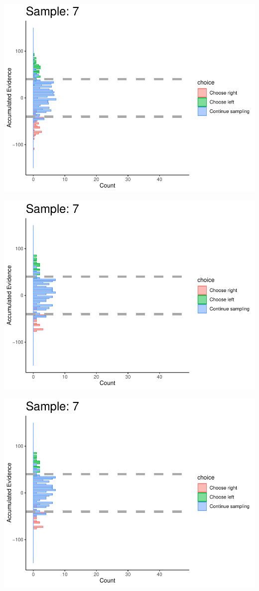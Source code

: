 \documentclass[
]{book}
\begin{document}
\begin{center}\includegraphics[width=0.8\linewidth]{LateNightBayes_files/figure-latex/collapsing_check-59} \end{center}

\begin{center}\includegraphics[width=0.8\linewidth]{LateNightBayes_files/figure-latex/collapsing_check-60} \end{center}

\begin{center}\includegraphics[width=0.8\linewidth]{LateNightBayes_files/figure-latex/collapsing_check-61} \end{center}
\end{document}
